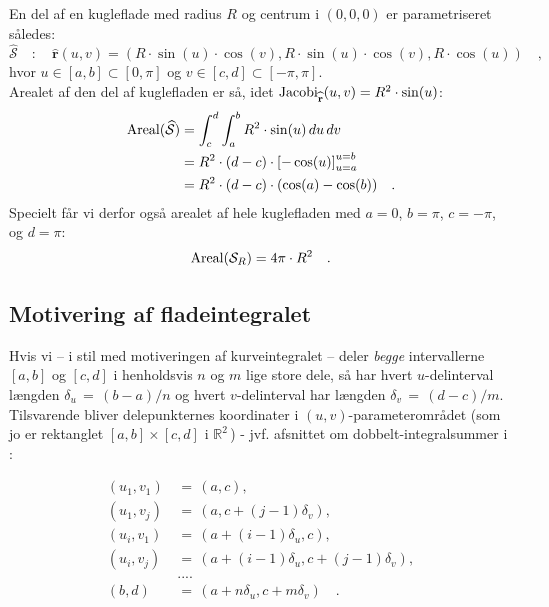 \begin{example} \label{exampArealKugleflade}
En del af en kugleflade med radius $R$ og centrum i $(0,0,0)$ er parametriseret således:
\begin{equation}
\widehat{\mathcal{S}} \quad : \quad \widehat{\mathbf{r}}(u,v) = (R \cdot \sin(u)\cdot \cos(v), R \cdot \sin(u)\cdot \cos(v), R \cdot \cos(u)) \quad ,
\end{equation}
hvor $u \in [a, b] \subset [0, \pi]$ og $v \in [c , d ] \subset [-\pi, \pi]$. \\

Arealet af den del af kuglefladen er så, idet $\operatorname{Jacobi}_{\widehat{\mathbf{r}}}(u,v) = R^{2}\cdot \sin(u)$:
\begin{equation}
\begin{aligned}
\operatorname{Areal}(\widehat{\mathcal{S}}) &= \int_{c}^{d} \int_{a}^{b} R^{2} \cdot \sin(u) \,du \, dv \\
&= R^{2}\cdot (d-c)\cdot\left[-\cos(u) \right]_{u=a}^{u=b} \\
&= R^{2} \cdot (d-c)\cdot(\cos(a) - \cos(b)) \quad . \\
\end{aligned}
\end{equation}
Specielt får vi derfor også arealet af hele kuglefladen med $a=0$, $b=\pi$, $c=-\pi$, og $d=\pi$:
\begin{equation}
\operatorname{Areal}(\mathcal{S}_{R}) = 4\pi\cdot R^{2} \quad.
\end{equation}
\end{example}


\subsection{Motivering af fladeintegralet}\label{subsecMotivFlade}
Hvis vi  -- i stil med motiveringen af kurveintegralet --  deler {\em begge}
intervallerne $[a, b]$ og
 $[c, d]$ i henholdsvis $n$ og $m$
lige store dele, så har hvert $u$-delinterval længden $\delta_{u} \,
= \, (b-a)/n$ og hvert $v$-delinterval har længden $\delta_{v} \, =
\, (d-c)/m$. Tilsvarende bliver delepunkternes koordinater i $(u,
v)$-parameterområdet (som jo er rektanglet $[a,b]\times[c,d]$ i
$\mathbb{R}^{2}\,$) - jvf. afsnittet om dobbelt-integralsummer i :

\begin{equation}
\begin{aligned}
(u_{1}, v_{1}) \, &= \, (a, c), \\
(u_{1}, v_{j}) \, &= \, (a, c + (j-1)\delta_{v}), \\
(u_{i}, v_{1}) \, &= \, (a + (i-1)\delta_{u}, c), \\
(u_{i}, v_{j}) \, &= \, (a + (i-1)\delta_{u}, c + (j-1)\delta_{v}), \\
 &.... \\
(b, d) \, &= \, (a + n\delta_{u}, c + m\delta_{v}) \quad .
\end{aligned}
\end{equation}

